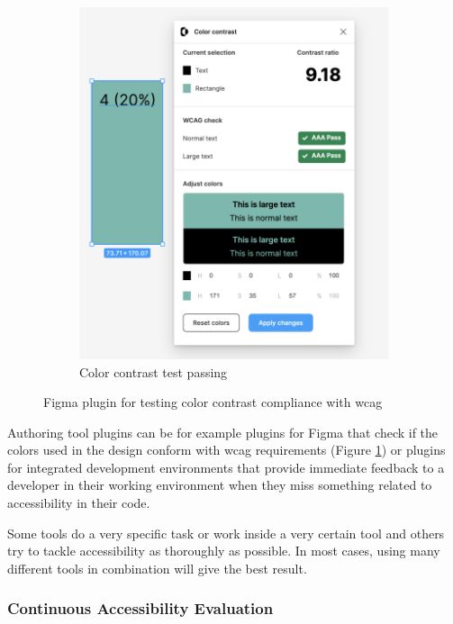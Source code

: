 \documentclass{master_thesis}
\begin{document}
\begin{figure}[ht]
\begin{subfigure}{0.4\textwidth}
		\includegraphics[width=\textwidth]{img/figma plugin-color-contrast-pass.png}
		\caption{Color contrast test passing}
	\end{subfigure}
\caption{Figma plugin for testing color contrast compliance with \ac{wcag}}
\label{fig:figma-plugin}
\end{figure}

Authoring tool plugins can be for example plugins for Figma that check if the colors used in the design conform with \ac{wcag} requirements (Figure \ref{fig:figma-plugin}) or plugins for integrated development environments that provide immediate feedback to a developer in their working environment when they miss something related to accessibility in their code.

Some tools do a very specific task or work inside a very certain tool and others try to tackle accessibility as thoroughly as possible. In most cases, using many different tools in combination will give the best result.

\subsubsection{Continuous Accessibility Evaluation} \label{continuous-a11y-evaluation}
\end{document}
